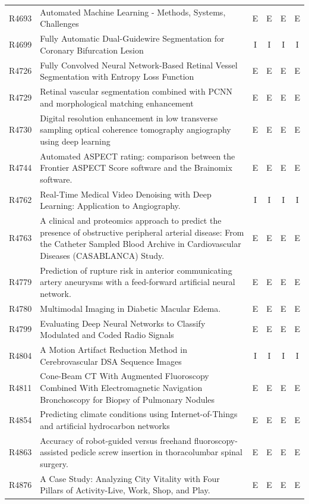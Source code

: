\begin{longtable}{@{}l p{8.6cm} c c c c@{}}
R4693 & Automated Machine Learning - Methods, Systems, Challenges & E & E & E & E \\
R4699 & Fully Automatic Dual-Guidewire Segmentation for Coronary Bifurcation Lesion & I & I & I & I \\
R4726 & Fully Convolved Neural Network-Based Retinal Vessel Segmentation with Entropy Loss Function & E & E & E & E \\
R4729 & Retinal vascular segmentation combined with PCNN and morphological matching enhancement & E & E & E & E \\
R4730 & Digital resolution enhancement in low transverse sampling optical coherence tomography angiography using deep learning & E & E & E & E \\
R4744 & Automated ASPECT rating: comparison between the Frontier ASPECT Score software and the Brainomix software. & E & E & E & E \\
R4762 & Real-Time Medical Video Denoising with Deep Learning: Application to Angiography. & I & I & I & I \\
R4763 & A clinical and proteomics approach to predict the presence of obstructive peripheral arterial disease: From the Catheter Sampled Blood Archive in Cardiovascular Diseases (CASABLANCA) Study. & E & E & E & E \\
R4779 & Prediction of rupture risk in anterior communicating artery aneurysms with a feed-forward artificial neural network. & E & E & E & E \\
R4780 & Multimodal Imaging in Diabetic Macular Edema. & E & E & E & E \\
R4799 & Evaluating Deep Neural Networks to Classify Modulated and Coded Radio Signals & E & E & E & E \\
R4804 & A Motion Artifact Reduction Method in Cerebrovascular DSA Sequence Images & I & I & I & I \\
R4811 & Cone-Beam CT With Augmented Fluoroscopy Combined With Electromagnetic Navigation Bronchoscopy for Biopsy of Pulmonary Nodules & E & E & E & E \\
R4854 & Predicting climate conditions using Internet-of-Things and artificial hydrocarbon networks & E & E & E & E \\
R4863 & Accuracy of robot-guided versus freehand fluoroscopy-assisted pedicle screw insertion in thoracolumbar spinal surgery. & E & E & E & E \\
R4876 & A Case Study: Analyzing City Vitality with Four Pillars of Activity-Live, Work, Shop, and Play. & E & E & E & E \\

\end{longtable}
